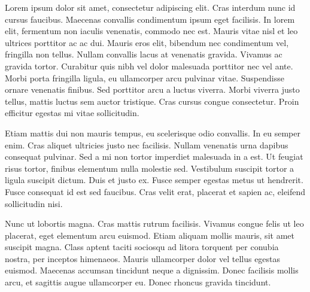 
Lorem ipsum dolor sit amet, consectetur adipiscing elit. Cras interdum nunc id cursus faucibus. Maecenas convallis condimentum ipsum eget facilisis. In lorem elit, fermentum non iaculis venenatis, commodo nec est. Mauris vitae nisl et leo ultrices porttitor ac ac dui. Mauris eros elit, bibendum nec condimentum vel, fringilla non tellus. Nullam convallis lacus at venenatis gravida. Vivamus ac gravida tortor. Curabitur quis nibh vel dolor malesuada porttitor nec vel ante. Morbi porta fringilla ligula, eu ullamcorper arcu pulvinar vitae. Suspendisse ornare venenatis finibus. Sed porttitor arcu a luctus viverra. Morbi viverra justo tellus, mattis luctus sem auctor tristique. Cras cursus congue consectetur. Proin efficitur egestas mi vitae sollicitudin.

Etiam mattis dui non mauris tempus, eu scelerisque odio convallis. In eu semper enim. Cras aliquet ultricies justo nec facilisis. Nullam venenatis urna dapibus consequat pulvinar. Sed a mi non tortor imperdiet malesuada in a est. Ut feugiat risus tortor, finibus elementum nulla molestie sed. Vestibulum suscipit tortor a ligula suscipit dictum. Duis et justo ex. Fusce semper egestas metus ut hendrerit. Fusce consequat id est sed faucibus. Cras velit erat, placerat et sapien ac, eleifend sollicitudin nisi.

Nunc ut lobortis magna. Cras mattis rutrum facilisis. Vivamus congue felis ut leo placerat, eget elementum arcu euismod. Etiam aliquam mollis mauris, sit amet suscipit magna. Class aptent taciti sociosqu ad litora torquent per conubia nostra, per inceptos himenaeos. Mauris ullamcorper dolor vel tellus egestas euismod. Maecenas accumsan tincidunt neque a dignissim. Donec facilisis mollis arcu, et sagittis augue ullamcorper eu. Donec rhoncus gravida tincidunt.

